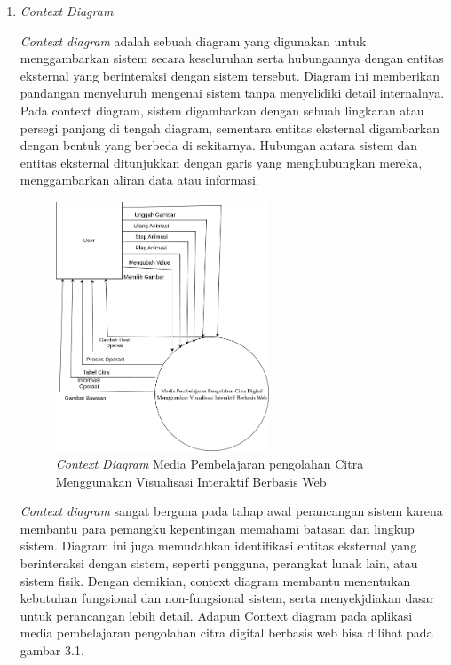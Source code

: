 \begin{enumerate}[leftmargin=1cm, itemindent=0.6cm,labelwidth=15pt, labelsep=5pt, listparindent=1cm,align=left]

\item\textit{Context Diagram}

\textit{Context diagram} adalah sebuah diagram yang digunakan untuk menggambarkan sistem secara keseluruhan serta hubungannya dengan entitas eksternal yang berinteraksi dengan sistem tersebut. Diagram ini memberikan pandangan menyeluruh mengenai sistem tanpa menyelidiki detail internalnya. Pada context diagram, sistem digambarkan dengan sebuah lingkaran atau persegi panjang di tengah diagram, sementara entitas eksternal digambarkan dengan bentuk yang berbeda di sekitarnya. Hubungan antara sistem dan entitas eksternal ditunjukkan dengan garis yang menghubungkan mereka, menggambarkan aliran data atau informasi.

          \begin{figure}[ht]
    	      \includegraphics[width=0.6\textwidth, center]{images/diagram-konteks2.png}
              \caption{\textit{Context Diagram} Media Pembelajaran pengolahan Citra Menggunakan Visualisasi Interaktif Berbasis Web}
          \end{figure}

\textit{Context diagram} sangat berguna pada tahap awal perancangan sistem karena membantu para pemangku kepentingan memahami batasan dan lingkup sistem. Diagram ini juga memudahkan identifikasi entitas eksternal yang berinteraksi dengan sistem, seperti pengguna, perangkat lunak lain, atau sistem fisik. Dengan demikian, context diagram membantu menentukan kebutuhan fungsional dan non-fungsional sistem, serta menyekjdiakan dasar untuk perancangan lebih detail. Adapun Context diagram pada aplikasi media pembelajaran pengolahan citra digital berbasis web bisa dilihat pada gambar 3.1.



\end{enumerate}
